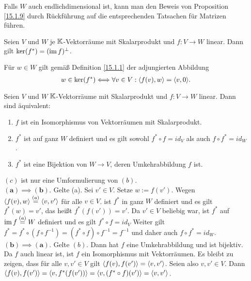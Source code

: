 \documentclass[../../main.tex]{subfiles}
\begin{document}
Falls $W$ auch endlichdimensional ist, kann man den Beweis von Proposition \ref{15.1.9} durch Rückführung auf die entsprechenden Tatsachen für Matrizen führen.

\begin{pro}\label{15.1.11}
Seien $V$ und $W$ je $\mathbb K$-Vektorräume mit Skalarprodukt und $f: V\to W$ linear. Dann gilt $\ker(f^*)=(\operatorname{im} f)^\perp$.
\end{pro}
\begin{cproof}
Für $w\in W$ gilt gemäß Definition \ref{15.1.1} der adjungierten Abbildung
\begin{align*}
w\in \ker(f^*)\Longleftrightarrow \forall v\in V: \langle f(v),w\rangle=\langle v,0\rangle.
\end{align*}
\end{cproof}

\begin{sat}\label{15.2.12}
Seien $V$ und $W$ $\mathbb K$-Vektorräume mit Skalarprodukt und $f: V\to W$ linear. Dann sind äquivalent:
\begin{enumerate}[\normalfont(a)]
\item  $f$ ist ein Isomorphismus von Vektorräumen mit Skalarprodukt.
\item $f^*$ ist auf ganz $W$ definiert und es gilt sowohl $f^*\circ f=id_V$ als auch $f\circ f^*=id_W$.
\item $f^*$ ist eine Bijektion von $W\to V$, deren Umkehrabbildung $f$ ist. 
\end{enumerate}
\end{sat}
\begin{cproof}
$(c)$ ist nur eine Umformulierung von $(b)$.\\

$\boldsymbol{(a)\implies(b)}$. Gelte (a). Sei $v'\in V$. Setze $w:=f(v')$. Wegen $\langle f(v),w\rangle\stackrel{(a)}{=}\langle v,v'\rangle$ für alle $v\in V$. ist $f^*$ in ganz $W$ definiert und es gilt $f^*(w)=v'$, das heißt $f^*(f(v'))=v'$. Da $v'\in V$ beliebig war, ist $f^*$ auf $\operatorname{im} f\stackrel{(a)}{=}W$ definiert und es gilt $f^*\circ f=id_V$ Weiter gilt $f^*=f^*\circ (f\circ f^{-1})=(f^*\circ f)\circ f^{-1}=f^{-1}$ und daher auch $f\circ f^*=id_W$.\\
		
\noindent$\boldsymbol{(b)\implies(a)}$. Gelte $(b)$. Dann hat $f$ eine Umkehrabbildung und ist bijektiv. Da $f$ auch linear ist, ist $f$ ein Isomorphismus mit Vektorräumen. Es bleibt zu zeigen, dass für alle $v,v'\in V$ gilt $\langle f(v),f(v')\rangle=\langle v,v'\rangle$. Seien also $v,v'\in V$. Dann
$\langle f(v),f(v')\rangle=\langle v,f^*(f(v'))\rangle=\langle v,(f^*\circ f)(v')\rangle=\langle v,v'\rangle$.
\end{cproof}
\end{document}
